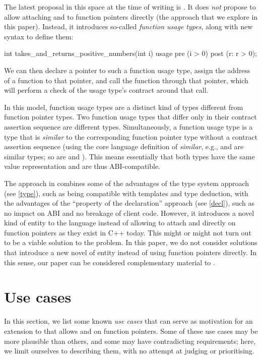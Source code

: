 The latest proposal in this space at the time of writing is \cite{P3271R0}. It does \emph{not} propose to allow attaching  and  to function pointers directly (the approach that we explore in this paper). Instead, it introduces so-called \emph{function usage types}, along with new syntax to define them:
\begin{codeblock}
int takes_and_returns_positive_numbers(int i) usage 
  pre (i > 0)
  post (r: r > 0);
\end{codeblock}
We can then declare a pointer to such a function usage type, assign the address of a function to that pointer, and call the function through that pointer, which will perform a check of the usage type's contract around that call.

In this model, function usage types are a distinct kind of types different from function pointer types. Two function usage types that differ only in their contract assertion sequence are different types. Simultaneously, a function usage type is a type that is \emph{similar} to the corresponding function pointer type without a contract assertion sequence (using the core language definition of \emph{similar}, e.g.,  and  are similar types; so are  and ). This means essentially that both types have the same value representation and are thus ABI-compatible.

The approach in \cite{P3271R0} combines some of the advantages of the type system approach (see \ref{type}), such as being compatible with templates and type deduction, with the advantages of the ``property of the declaration'' approach (see \ref{decl}), such as no impact on ABI and no breakage of client code. However, it introduces a novel kind of entity to the language instead of allowing to attach  and  directly on function pointers as they exist in C++ today. This might or might not turn out to be a viable solution to the problem. In this paper, we do not consider solutions that introduce a new novel of entity instead of using function pointers directly. In this sense, our paper can be considered complementary material to \cite{P3271R0}.

\section{Use cases}
\label{usecases}

In this section, we list some known \emph{use cases} that can serve as motivation for an extension to \cite{P2900R8} that allows  and  on function pointers. Some of these use cases may be more plausible than others, and some may have contradicting requirements; here, we limit ourselves to describing them, with no attempt at judging or prioritising.

